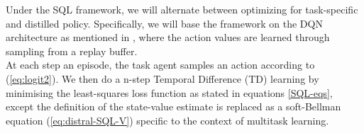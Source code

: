 \documentclass[12pt]{report}
\begin{document}
Under the SQL framework, we will alternate between optimizing for task-specific and distilled policy. Specifically, we will base the framework on the DQN architecture as mentioned in \cite{mnih2013playing} \cite{mnih2015human}, where the action values are learned through sampling from a replay buffer.\\

At each step an episode, the task agent samples an action according to (\ref{eq:logit2}). We then do a n-step Temporal Difference (TD) learning by minimising the least-squares loss function as stated in equations \ref{SQL-eqs}, except the definition of the state-value estimate is replaced as a soft-Bellman equation (\ref{eq:distral-SQL-V}) specific to the context of multitask learning.\\


\end{document}
